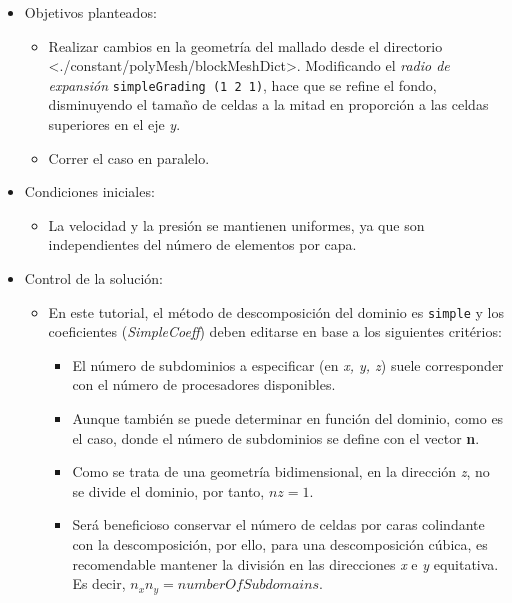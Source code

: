 \begin{itemize}
\item
  Objetivos planteados:

  \begin{itemize}
  \item
    Realizar cambios en la geometría del mallado desde el directorio
    \textless{}./constant/polyMesh/blockMeshDict\textgreater{}.
    Modificando el \emph{radio de expansión}
    \texttt{simpleGrading\ (1\ 2\ 1)}, hace que se refine el fondo,
    disminuyendo el tamaño de celdas a la mitad en proporción a las
    celdas superiores en el eje \emph{y}.
  \item
    Correr el caso en paralelo.
  \end{itemize}
\item
  Condiciones iniciales:

  \begin{itemize}
  \item
    La velocidad y la presión se mantienen uniformes, ya que son
    independientes del número de elementos por capa.
  \end{itemize}
\item
  Control de la solución:

  \begin{itemize}
  \item
    En este tutorial, el método de descomposición del dominio es
    \texttt{simple} y los coeficientes (\emph{SimpleCoeff}) deben
    editarse en base a los siguientes critérios:

    \begin{itemize}
    \item
      El número de subdominios a especificar (en \emph{x, y, z}) suele
      corresponder con el número de procesadores disponibles.
    \item
      Aunque también se puede determinar en función del dominio, como es
      el caso, donde el número de subdominios se define con el vector
      \textbf{n}.
    \item
      Como se trata de una geometría bidimensional, en la dirección
      \emph{z}, no se divide el dominio, por tanto, \(nz=1\).
    \item
      Será beneficioso conservar el número de celdas por caras
      colindante con la descomposición, por ello, para una
      descomposición cúbica, es recomendable mantener la división en las
      direcciones \emph{x} e \emph{y} equitativa. Es decir,
      \(n_xn_y= numberOfSubdomains\).
    \end{itemize}
  \end{itemize}
\end{itemize}

